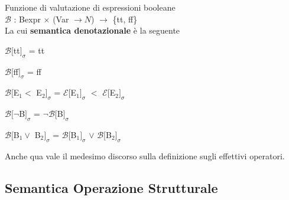 \documentclass[10pt]{book}
\begin{document}
\begin{list}{}{Inoltre, per valutare le espressioni generate dalla grammatica, servono delle \textbf{funzioni di valutazione}. Esse \textbf{trovano il significato di ogni espressione}}
	\item Funzione di valutazione di espressioni booleane\\$\mathscr{B}$ : Bexpr $\times$ (Var $\rightarrow N$) $\rightarrow$ \{tt, ff\}\\
	La cui \textbf{semantica denotazionale} è la seguente
	\begin{multicols}{2}
	\begin{list}{}{}
		\item $\mathscr{B}[$tt$]_\sigma$ = tt
		\item $\mathscr{B}[$ff$]_\sigma$ = ff
		\item $\mathscr{B}[$E$_1 <$ E$_2]_\sigma$ = $\mathscr{E}[$E$_1]_\sigma$ $<$ $\mathscr{E}[$E$_2]_\sigma$
		\item $\mathscr{B}[\neg$B$]_\sigma$ = $\neg\mathscr{B}[$B$]_\sigma$
		\item $\mathscr{B}[$B$_1 \vee$ B$_2]_\sigma$ = $\mathscr{B}[$B$_1]_\sigma$ $\vee$ $\mathscr{B}[$B$_2]_\sigma$
	\end{list}
	\end{multicols}
	Anche qua vale il medesimo discorso sulla definizione sugli effettivi operatori.
\end{list}
\subsection{Semantica Operazione Strutturale}
\end{document}
